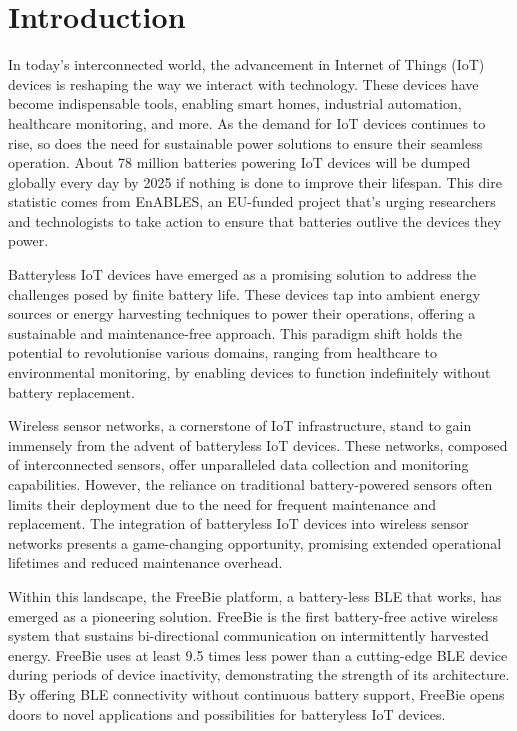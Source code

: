 \chapter{Introduction}
\label{chp:introduction}

In today's interconnected world, the advancement in Internet of Things (IoT) devices is reshaping the way we interact with technology. These devices have become indispensable tools, enabling smart homes, industrial automation, healthcare monitoring, and more. As the demand for IoT devices continues to rise, so does the need for sustainable power solutions to ensure their seamless operation. About 78 million batteries powering IoT devices will be dumped globally every day by 2025 if nothing is done to improve their lifespan. This dire statistic comes from EnABLES, an EU-funded project that’s urging researchers and technologists to take action to ensure that batteries outlive the devices they power.
 
\noindent Batteryless IoT devices have emerged as a promising solution to address the challenges posed by finite battery life. These devices tap into ambient energy sources or energy harvesting techniques to power their operations, offering a sustainable and maintenance-free approach. This paradigm shift holds the potential to revolutionise various domains, ranging from healthcare to environmental monitoring, by enabling devices to function indefinitely without battery replacement.

\noindent Wireless sensor networks, a cornerstone of IoT infrastructure, stand to gain immensely from the advent of batteryless IoT devices. These networks, composed of interconnected sensors, offer unparalleled data collection and monitoring capabilities. However, the reliance on traditional battery-powered sensors often limits their deployment due to the need for frequent maintenance and replacement. The integration of batteryless IoT devices into wireless sensor networks presents a game-changing opportunity, promising extended operational lifetimes and reduced maintenance overhead.

\noindent Within this landscape, the FreeBie platform, a battery-less BLE that works, has emerged as a pioneering solution. FreeBie is the first battery-free active wireless system that sustains bi-directional communication on intermittently harvested energy. FreeBie uses at least 9.5 times less power than a cutting-edge BLE device during periods of device inactivity, demonstrating the strength of its architecture. By offering BLE connectivity without continuous battery support, FreeBie opens doors to novel applications and possibilities for batteryless IoT devices.

